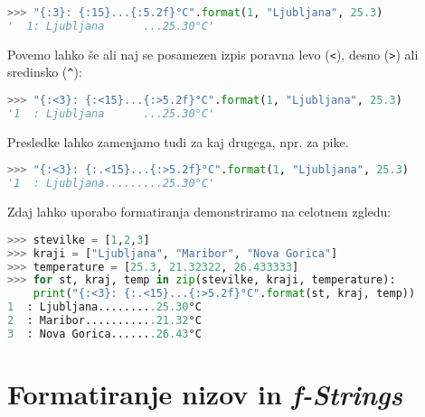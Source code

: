 \begin{lstlisting}[language=Python]
>>> "{:3}: {:15}...{:5.2f}°C".format(1, "Ljubljana", 25.3)
'  1: Ljubljana      ...25.30°C'
\end{lstlisting}
Povemo lahko še ali naj se posamezen izpis poravna levo (\texttt{<}), desno (\texttt{>}) ali sredinsko (\texttt{\^}):
\begin{lstlisting}[language=Python]
>>> "{:<3}: {:<15}...{:>5.2f}°C".format(1, "Ljubljana", 25.3)
'1  : Ljubljana      ...25.30°C'
\end{lstlisting}
Presledke lahko zamenjamo tudi za kaj drugega, npr. za pike.
\begin{lstlisting}[language=Python]
>>> "{:<3}: {:.<15}...{:>5.2f}°C".format(1, "Ljubljana", 25.3)
'1  : Ljubljana.........25.30°C'
\end{lstlisting}
Zdaj lahko uporabo formatiranja demonstriramo na celotnem zgledu:
\begin{lstlisting}[language=Python]
>>> stevilke = [1,2,3]
>>> kraji = ["Ljubljana", "Maribor", "Nova Gorica"]
>>> temperature = [25.3, 21.32322, 26.433333]
>>> for st, kraj, temp in zip(stevilke, kraji, temperature):
	print("{:<3}: {:.<15}...{:>5.2f}°C".format(st, kraj, temp))
1  : Ljubljana.........25.30°C
2  : Maribor...........21.32°C
3  : Nova Gorica.......26.43°C
\end{lstlisting}

\section{Formatiranje nizov in \emph{f-Strings}}

